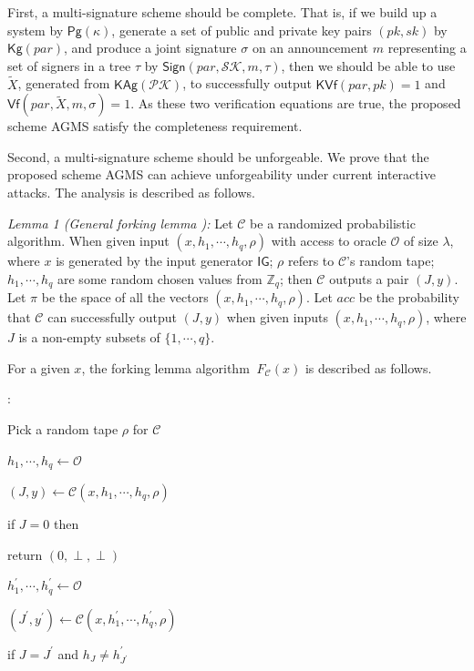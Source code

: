 \documentclass[journal]{IEEEtran}
\begin{document}
First, a multi-signature scheme should be complete. That is, if we build up a system by \(\textsf{Pg}(\kappa)\), generate a set of public and private key pairs \((pk,sk)\) by \(\textsf{Kg}(par)\), and produce a joint signature \(\sigma\) on an announcement \(m\) representing a set of signers in a tree \(\tau\) by \(\textsf{Sign}(par,\mathcal{SK},m,\tau)\), then we should be able to use \(\tilde{X}\), generated from \(\textsf{KAg}(\mathcal{PK})\), to successfully output \(\textsf{KVf}(par,pk)=1\) and \(\textsf{Vf}(par,\tilde{X},m,\sigma)=1\). As these two verification equations are true, the proposed scheme AGMS satisfy the completeness requirement.

Second, a multi-signature scheme should be unforgeable. We prove that the proposed scheme AGMS can achieve unforgeability under current interactive attacks. The analysis is described as follows.

\noindent\emph{Lemma 1 (General forking lemma \cite{04DBLP:conf/ccs/BellareN06}):} Let \(\mathcal{C}\) be a randomized probabilistic algorithm. When given input \((x,h_1,\cdots,h_{q},\rho)\) with access to oracle \(\mathcal{O}\) of size \(\lambda\), where \(x\) is generated by the input generator \(\textsf{IG}\); \(\rho\) refers to \(\mathcal{C}\)'s random tape; \(h_1,\cdots,h_{q}\) are some random chosen values from \(\mathbb{Z}_q\); then \(\mathcal{C}\) outputs a pair \((J,y)\). Let \(\pi\) be the space of all the vectors \((x,h_1,\cdots,h_{q},\rho)\). Let \(acc\) be the probability that \(\mathcal{C}\) can successfully output \((J,y)\) when given inputs \((x,h_1,\cdots,h_{q},\rho)\), where \(J\) is a non-empty subsets of \(\{1,\cdots,q\}\).

For a given \(x\), the forking lemma algorithm \( \ F_{\mathcal{C}} (x)\) is described as follows.

:

Pick a random tape \(\rho\) for \(\mathcal{C}\)

\(h_1,\cdots,h_{q}\leftarrow \mathcal{O}\)

\((J,y)\leftarrow\mathcal{C}(x,h_1,\cdots,h_{q},\rho)\)

if \(J=0\) then

\qquad return \((0,\perp,\perp)\)

\(h_1^\prime,\cdots,h_q^\prime\leftarrow \mathcal{O}\)

\((J^\prime,y^\prime)\leftarrow\mathcal{C}(x,h_1^\prime,\cdots,h_q^\prime,\rho)\)

if \(J=J^\prime\) and \(h_J\neq h^\prime_{J^{\prime}}\)
\end{document}
